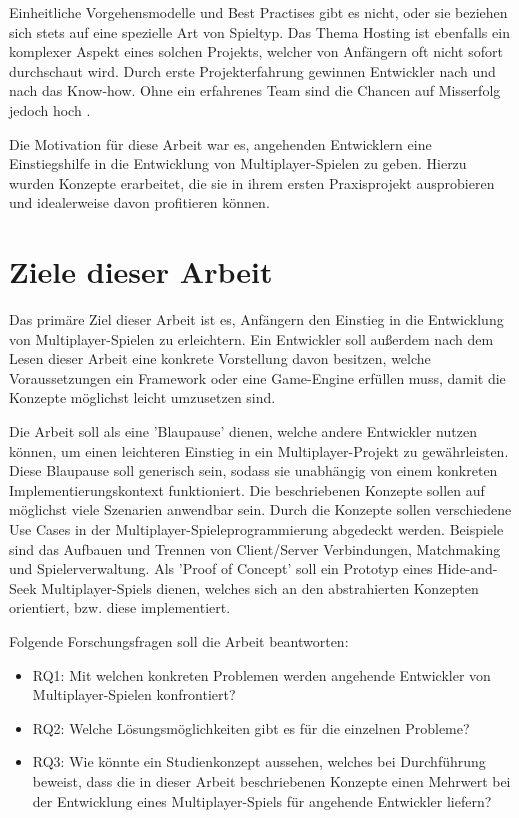 Einheitliche Vorgehensmodelle und Best Practises gibt es nicht, oder sie beziehen sich stets auf eine spezielle Art von Spieltyp. Das Thema Hosting ist ebenfalls ein komplexer Aspekt eines solchen Projekts, welcher von Anfängern oft nicht sofort durchschaut wird. Durch erste Projekterfahrung gewinnen Entwickler nach und nach das Know-how. Ohne ein erfahrenes Team sind die Chancen auf Misserfolg jedoch hoch \cite{Payne.18.09.2019}. 

Die Motivation für diese Arbeit war es, angehenden Entwicklern eine Einstiegshilfe in die Entwicklung von Multiplayer-Spielen zu geben. Hierzu wurden Konzepte erarbeitet, die sie in ihrem ersten Praxisprojekt ausprobieren und idealerweise davon profitieren können.

\section{Ziele dieser Arbeit}

Das primäre Ziel dieser Arbeit ist es, Anfängern den Einstieg in die Entwicklung von Multiplayer-Spielen zu erleichtern. Ein Entwickler soll außerdem nach dem Lesen dieser Arbeit eine konkrete Vorstellung davon besitzen, welche Voraussetzungen ein Framework oder eine Game-Engine erfüllen muss, damit die Konzepte möglichst leicht umzusetzen sind.

Die Arbeit soll als eine 'Blaupause' dienen, welche andere Entwickler nutzen können, um einen leichteren Einstieg in ein Multiplayer-Projekt zu gewährleisten. Diese Blaupause soll generisch sein, sodass sie unabhängig von einem konkreten Implementierungskontext funktioniert. Die beschriebenen Konzepte sollen auf möglichst viele Szenarien anwendbar sein. Durch die Konzepte sollen verschiedene Use Cases in der Multiplayer-Spieleprogrammierung abgedeckt werden. Beispiele sind das Aufbauen und Trennen von Client/Server Verbindungen, Matchmaking und Spielerverwaltung. Als 'Proof of Concept' soll ein Prototyp eines Hide-and-Seek Multiplayer-Spiels dienen, welches sich an den abstrahierten Konzepten orientiert, bzw. diese implementiert. 

Folgende Forschungsfragen soll die Arbeit beantworten:

\begin{itemize}
	\item \label{RQ1} RQ1: Mit welchen konkreten Problemen werden angehende Entwickler von Multiplayer-Spielen konfrontiert?
	\item \label{RQ2} RQ2: Welche Lösungsmöglichkeiten gibt es für die einzelnen Probleme?
	\item \label{RQ3} RQ3: Wie könnte ein Studienkonzept aussehen, welches bei Durchführung beweist, dass die in dieser Arbeit beschriebenen Konzepte einen Mehrwert bei der Entwicklung eines Multiplayer-Spiels für angehende Entwickler liefern?
\end{itemize}

